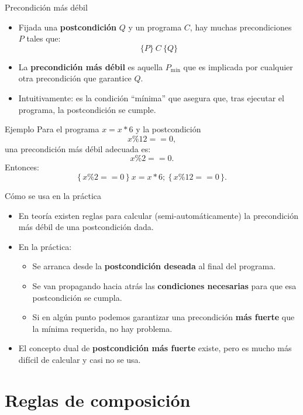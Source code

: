 \documentclass[aspectratio=169]{beamer}
\begin{document}
\begin{frame}{Precondición más débil}
  \begin{itemize}
    \item Fijada una \textbf{postcondición} \(Q\) y un programa \(C\), hay muchas precondiciones \(P\) tales que:
      \[
        \{P\}\ C\ \{Q\}
      \]
    \item La \textbf{precondición más débil} es aquella \(P_{\text{mín}}\) que es implicada por cualquier otra precondición que garantice \(Q\).
    \item Intuitivamente: es la condición “mínima” que asegura que, tras ejecutar el programa, la postcondición se cumple.
  \end{itemize}
  \begin{block}{Ejemplo}
    Para el programa \(x = x * 6\) y la postcondición
    \[
      x \% 12 == 0,
    \]
    una precondición más débil adecuada es:
    \[
      x \% 2 == 0.
    \]
    Entonces:
    \[
      \{\, x \% 2 == 0 \,\}\ x = x * 6;\ \{\, x \% 12 == 0 \,\}.
    \]
  \end{block}
\end{frame}

\begin{frame}{Cómo se usa en la práctica}
  \begin{itemize}
    \item En teoría existen reglas para calcular (semi-automáticamente) la precondición más débil de una postcondición dada.
    \item En la práctica:
      \begin{itemize}
        \item Se arranca desde la \textbf{postcondición deseada} al final del programa.
        \item Se van propagando hacia atrás las \textbf{condiciones necesarias} para que esa postcondición se cumpla.
        \item Si en algún punto podemos garantizar una precondición \textbf{más fuerte} que la mínima requerida, no hay problema.
      \end{itemize}
    \item El concepto dual de \textbf{postcondición más fuerte} existe, pero es mucho más difícil de calcular y casi no se usa.
  \end{itemize}
\end{frame}

\section{Reglas de composición}
\end{document}
